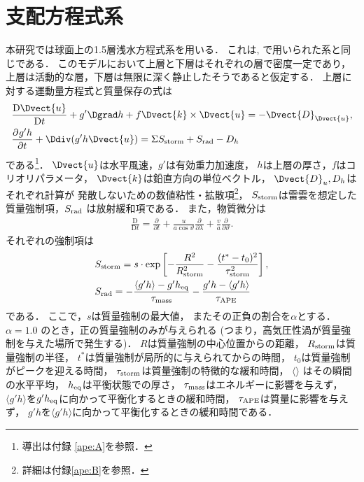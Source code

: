 \documentclass[a4j,12pt,openbib,oneside]{jreport}
\def\DD#1#2{\frac{\mathrm D #1}{\mathrm D #2}}
\renewcommand{\DP}[3][]{\frac{\partial^{#1} #2}{\partial #3^{#1}}}
\begin{document}
\section{支配方程式系}
\label{sec:model1}
本研究では球面上の1.5層浅水方程式系を用いる．
これは\cite{Showman2007}, \cite{Brueshaber2019}で用いられた系と同じである．
このモデルにおいて上層と下層はそれぞれの層で密度一定であり，
上層は活動的な層，下層は無限に深く静止したそうであると仮定する．
上層に対する運動量方程式と質量保存の式は
%
\begin{align}
& \DD{\Dvect{u}}{t}+ g' \Dgrad h + f \Dvect{k} \times \Dvect{u} = -\Dvect{D}_{\Dvect{u}},  \label{eq:eq1} \\
& \DP{g'h}{t} + \Ddiv (g'h\Dvect{u}) = \Sigma S_{{\rm{storm}}} + S_{{\rm{rad}}} - D_h \label{eq:eq2} 
\end{align}
%
である\footnote{導出は付録 \ref{ape:A}を参照．}．
$\Dvect{u}$は水平風速，$g'$は有効重力加速度，
$h$は上層の厚さ，$f$はコリオリパラメータ，
$\Dvect{k}$は鉛直方向の単位ベクトル，
$\Dvect{D}_u, D_h$はそれぞれ計算が
発散しないための数値粘性・拡散項\footnote{詳細は付録\ref{ape:B}を参照．}，
$S_{{\rm{storm}}}$は雷雲を想定した質量強制項，$S_{{\rm{rad}}}$ は放射緩和項である．
また，物質微分は
\begin{align}
\DD{}{t} = \DP{}{t} + \frac{u}{a\cos{\vartheta}} \DP{}{\lambda}
+\frac{v}{a} \DP{}{\vartheta}.
\end{align}
それぞれの強制項は
\begin{align}
&S_{{\rm{storm}}} = s \cdot \exp \left [- \frac{R^2}{R_{{\rm{storm}}}^2} - \frac{(t^*-t_0)^2}{\tau_{{\rm{storm}}}^2} \right ], \label{eq:eq3}\\
&S_{{\rm{rad}}}  = - \frac{\langle g'h \rangle - g'h_{{\rm{eq}}}}{\tau_{{\rm{mass}}}} - \frac{g'h - \langle g'h \rangle}{\tau_{{\rm{APE}}}} \label{eq:eq4}
\end{align}
である．
%
ここで，$s$は質量強制の最大値，
またその正負の割合を$\alpha$とする．
$\alpha=1.0$ のとき，正の質量強制のみが与えられる
(つまり，高気圧性渦が質量強制を与えた場所で発生する)．
$R$は質量強制の中心位置からの距離，
$R_{{\rm{storm}}}$は質量強制の半径，
$t^*$は質量強制が局所的に与えられてからの時間，
$t_0$は質量強制がピークを迎える時間，
$\tau_{{\rm{storm}}}$は質量強制の特徴的な緩和時間，
$\langle \rangle$ はその瞬間の水平平均，
$h_{{\rm{eq}}}$は平衡状態での厚さ，
$\tau_{{\rm{mass}}}$はエネルギーに影響を与えず，
$\langle g'h \rangle $を$g'h_{{\rm{eq}}}$に向かって平衡化するときの緩和時間，
$\tau_{{\rm{APE}}}$は質量に影響を与えず，
$g'h$を$\langle g'h \rangle$に向かって平衡化するときの緩和時間である．
\end{document}
